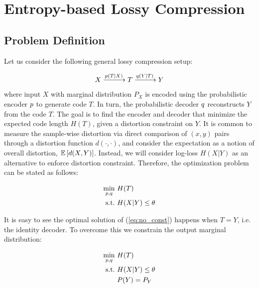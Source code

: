 \chapter{Entropy-based Lossy Compression} \label{chap-3}

\section{Problem Definition}

Let us consider the following general lossy compression setup:

\begin{equation}
    X \xrightarrow{p(T|X)} T \xrightarrow{q(Y|T)} Y
\end{equation}

where input $X$ with marginal distribution $P_X$ is encoded using the probabilistic encoder $p$ to generate code $T$. In turn, the probabilistic decoder $q$ reconstructs $Y$ from the code $T$. The goal is to find the encoder and decoder that minimize the expected code length $H(T)$, given a distortion constraint on $Y$. It is common to measure the sample-wise distortion via direct comparison of $(x, y)$ pairs through a distortion function $d(\cdot, \cdot)$, and consider the expectation as a notion of overall distortion, $\mathbb{E} \left[ d(X,Y)  \right]$. Instead, we will consider log-loss $H(X|Y)$ as an alternative to enforce distortion constraint. Therefore, the optimization problem can be stated as follows:

\begin{equation}
\begin{aligned} \label{eq:no_const}
    \min_{p, q} \ &H(T)\\
    \textrm{s.t.} \ &H(X|Y) \leq \theta
\end{aligned}
\end{equation}

It is easy to see the optimal solution of (\ref{eq:no_const}) happens when $T=Y$, i.e. the identity decoder. To overcome this we constrain the output marginal distribution:

\begin{equation}
\begin{aligned} \label{eq:no_const}
    \min_{p, q} \ &H(T) \\
    \textrm{s.t.} \ &H(X|Y) \leq \theta \\
    &P(Y) = P_Y
\end{aligned}
\end{equation}

